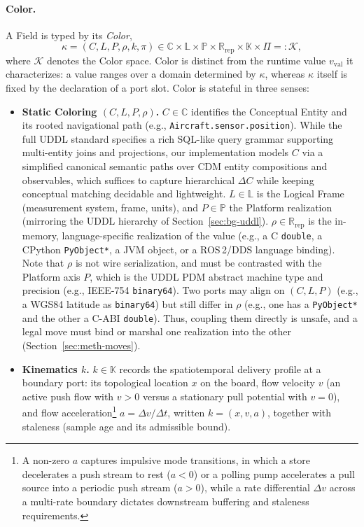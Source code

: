 \paragraph{Color.} A Field is typed by its \emph{Color},
\begin{equation}
    \kappa = (C, L, P, \rho, k, \pi) \in \mathbb{C} \times \mathbb{L} \times \mathbb{P} \times \mathbb{R}_{\text{rep}} \times \mathbb{K} \times \Pi =: \mathcal{K},
    \label{eq:stateful-color}
\end{equation}
where $\mathcal{K}$ denotes the Color space.  Color is distinct from the runtime value $v_{\text{val}}$ it characterizes: a value ranges over a domain determined by $\kappa$, whereas $\kappa$ itself is fixed by the declaration of a port slot.  Color is stateful in three senses:
\begin{itemize}[topsep=2pt, itemsep=1pt, leftmargin=1.8em]
    \item \textbf{Static Coloring $(C, L, P, \rho)$.} $C \in \mathbb{C}$ identifies the Conceptual Entity and its rooted navigational path (e.g., \texttt{Aircraft.sensor.position}).  While the full UDDL standard specifies a rich SQL-like query grammar supporting multi-entity joins and projections, our implementation models $C$ via a simplified canonical semantic paths over CDM entity compositions and observables, which suffices to capture hierarchical $\Delta C$ while keeping conceptual matching decidable and lightweight.  $L \in \mathbb{L}$ is the Logical Frame (measurement system, frame, units), and $P \in \mathbb{P}$ the Platform realization (mirroring the UDDL hierarchy of Section~\ref{sec:bg-uddl}).  $\rho \in \mathbb{R}_{\text{rep}}$ is the in-memory, language-specific realization of the value (e.g., a C \texttt{double}, a CPython \texttt{PyObject*}, a JVM object, or a ROS\,2/DDS language binding).  Note that $\rho$ is not wire serialization, and must be contrasted with the Platform axis $P$, which is the UDDL PDM abstract machine type and precision (e.g., IEEE-754 \texttt{binary64}).  Two ports may align on $(C, L, P)$ (e.g., a WGS84 latitude as \texttt{binary64}) but still differ in $\rho$ (e.g., one has a \texttt{PyObject*} and the other a C-ABI \texttt{double}).  Thus, coupling them directly is unsafe, and a legal move must bind or marshal one realization into the other (Section~\ref{sec:meth-moves}).
    \item \textbf{Kinematics $k$.} $k \in \mathbb{K}$ records the spatiotemporal delivery profile at a boundary port: its topological location $x$ on the board, flow velocity $v$ (an active push flow with $v > 0$ versus a stationary pull potential with $v = 0$), and flow acceleration\footnote{A non-zero $a$ captures impulsive mode transitions, in which a store decelerates a push stream to rest ($a < 0$) or a polling pump accelerates a pull source into a periodic push stream ($a > 0$), while a rate differential $\Delta v$ across a multi-rate boundary dictates downstream buffering and staleness requirements.} $a = \Delta v / \Delta t$, written $k = (x, v, a)$, together with staleness (sample age and its admissible bound).

\end{itemize}
